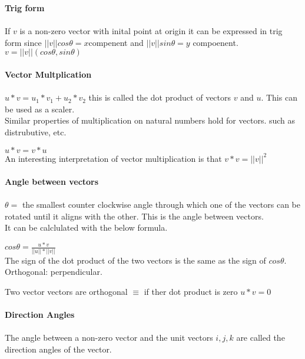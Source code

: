 \documentclass[14pt]{extreport}
\begin{document}
\textbf{Trig form}\\\\

If $v$ is a non-zero vector with inital point at origin it can be expressed in trig form since $||v||cos\theta = x$compenent and $||v||sin\theta =y$ compoenent.\\

$v = ||v||(cos\theta, sin\theta)$\\\\

\textbf{Vector Multplication}\\\\

$u * v = u_1 * v_1 + u_2 * v_2$ this is called the dot product of vectors $v$ and $u$. This can be used as a scaler.\\

Similar properties of multiplication on natural numbers hold for vectors. such as distrubutive, etc.

$u * v = v * u$\\

An interesting interpretation of vector multiplication is that $v * v = ||v||^2$\\\\



\textbf{Angle between vectors}\\\\

$\theta =$ the smallest counter clockwise angle through which one of the vectors can be rotated until it aligns with the other. This is the angle between vectors.\\
It can be calclulated with the below formula.

$cos \theta = \frac{u * v}{||u||*||v||}$\\

The sign of the dot product of the two vectors is the same as the sign of $cos \theta$.\\

Orthogonal: perpendicular.

Two vector vectors are orthogonal $\equiv$ if ther dot product is zero $u*v = 0$\\\\

\textbf{Direction Angles}\\\\

The angle between a non-zero vector and the unit vectors $i, j, k$ are called the direction angles of the vector.
\end{document}
